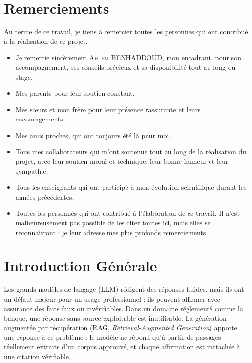 \documentclass[a4paper,12pt]{report}
\newcommand{\EncadrantNom}{Ahlem BENHADDOUD}          %
\begin{document}
\chapter*{Remerciements}
Au terme de ce travail, je tiens \`a remercier toutes les personnes qui ont contribu\'e \`a la r\'ealisation de ce projet.
\begin{itemize}
    \item Je remercie sinc\`erement \textsc{\EncadrantNom}, mon encadrant, pour son accompagnement, ses conseils pr\'ecieux et sa disponibilit\'e tout au long du stage.
    \item Mes parents pour leur soutien constant.
    \item Mes s\oe urs et mon fr\`ere pour leur pr\'esence rassurante et leurs encouragements.
    \item Mes amis proches, qui ont toujours \'{e}t\'e l\`a pour moi.
    \item Tous mes collaborateurs qui m'ont soutenue tout au long de la r\'ealisation du projet, avec leur soutien moral et technique, leur bonne humeur et leur sympathie.
    \item Tous les enseignants qui ont particip\'e \`a mon \'evolution scientifique durant les ann\'ees pr\'ec\'edentes.
    \item Toutes les personnes qui ont contribu\'e \`a l'\'elaboration de ce travail. Il n'est malheureusement pas possible de les citer toutes ici, mais elles se reconna\^{\i}tront : je leur adresse mes plus profonds remerciements.
\end{itemize}

\chapter*{Introduction G\'en\'erale}
Les grands mod\`eles de langage (LLM) r\'edigent des r\'eponses fluides, mais ils ont un d\'efaut majeur pour un usage professionnel : ils peuvent affirmer avec assurance des faits faux ou inv\'erifiables. Dans un domaine r\'eglement\'e comme la banque, une r\'eponse sans source exploitable est inutilisable. La g\'en\'eration augment\'ee par r\'ecup\'eration (RAG, \textit{Retrieval-Augmented Generation}) apporte une r\'eponse \`a ce probl\`eme : le mod\`ele ne r\'epond qu'\`a partir de passages r\'eellement extraits d'un corpus approuv\'e, et chaque affirmation est rattach\'ee \`a une citation v\'erifiable.
\end{document}
